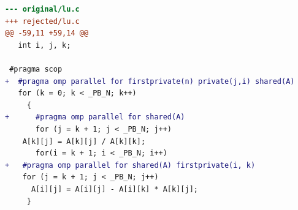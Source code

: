 \begin{lstlisting}[language=diff,basicstyle=\ttfamily\scriptsize,breaklines=true,caption={polybench/lu — attempt 2 of 2, rejected by the gate at 'correctness': Program output changed for input '7' — the patched program is NOT semantically equivalent to the original. / This input differs from the one the profile was tak}]
--- original/lu.c
+++ rejected/lu.c
@@ -59,11 +59,14 @@
   int i, j, k;
 
 #pragma scop
+  #pragma omp parallel for firstprivate(n) private(j,i) shared(A) 
   for (k = 0; k < _PB_N; k++)
     {
+      #pragma omp parallel for shared(A)
       for (j = k + 1; j < _PB_N; j++)
 	A[k][j] = A[k][j] / A[k][k];
       for(i = k + 1; i < _PB_N; i++)
+	#pragma omp parallel for shared(A) firstprivate(i, k)
 	for (j = k + 1; j < _PB_N; j++)
 	  A[i][j] = A[i][j] - A[i][k] * A[k][j];
     }
\end{lstlisting}
